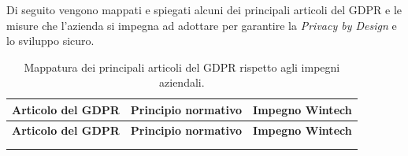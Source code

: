 Di seguito vengono mappati e spiegati alcuni dei principali articoli del GDPR e le misure che l'azienda si impegna ad adottare per garantire la \emph{Privacy by Design} e lo sviluppo sicuro.
\begin{longtable}{ >{\raggedright\arraybackslash}p{} p{} p{} }
\toprule
\textbf{Articolo del GDPR} & \textbf{Principio normativo} & \textbf{Impegno Wintech} \\
\midrule
\endfirsthead

\toprule
\textbf{Articolo del GDPR} & \textbf{Principio normativo} & \textbf{Impegno Wintech} \\
\midrule
\endhead

\midrule
\noalign{\vspace{10pt}}
\caption[]{Mappatura dei principali articoli del GDPR rispetto agli impegni aziendali.} \\
\endfoot


\end{longtable}
